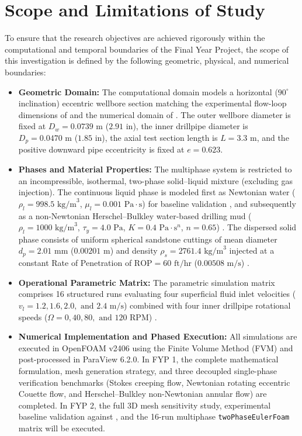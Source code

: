 \section{Scope and Limitations of Study}
To ensure that the research objectives are achieved rigorously within the computational and temporal boundaries of the Final Year Project, the scope of this investigation is defined by the following geometric, physical, and numerical boundaries:
\begin{itemize}
    \item \textbf{Geometric Domain:} The computational domain models a horizontal ($90^\circ$ inclination) eccentric wellbore section matching the experimental flow-loop dimensions of \citet{Osgouei2010} and the numerical domain of \citet{Shehab2015}. The outer wellbore diameter is fixed at $D_w = 0.0739\text{ m}$ ($2.91\text{ in}$), the inner drillpipe diameter is $D_p = 0.0470\text{ m}$ ($1.85\text{ in}$), the axial test section length is $L = 3.3\text{ m}$, and the positive downward pipe eccentricity is fixed at $e = 0.623$.
    \item \textbf{Phases and Material Properties:} The multiphase system is restricted to an incompressible, isothermal, two-phase solid--liquid mixture (excluding gas injection). The continuous liquid phase is modeled first as Newtonian water ($\rho_l = 998.5\text{ kg/m}^3$, $\mu_l = 0.001\text{ Pa}\cdot\text{s}$) for baseline validation \citep{Shehab2015}, and subsequently as a non-Newtonian Herschel--Bulkley water-based drilling mud ($\rho_l = 1000\text{ kg/m}^3$, $\tau_y = 4.0\text{ Pa}$, $K = 0.4\text{ Pa}\cdot\text{s}^n$, $n = 0.65$) \citep{Hajipour2020, Sorgun2010}. The dispersed solid phase consists of uniform spherical sandstone cuttings of mean diameter $d_p = 2.01\text{ mm}$ ($0.00201\text{ m}$) and density $\rho_s = 2761.4\text{ kg/m}^3$ injected at a constant Rate of Penetration of $\text{ROP} = 60\text{ ft/hr}$ ($0.00508\text{ m/s}$) \citep{Osgouei2010, Shehab2015}.
    \item \textbf{Operational Parametric Matrix:} The parametric simulation matrix comprises 16 structured runs evaluating four superficial fluid inlet velocities ($v_l = 1.2, 1.6, 2.0,\text{ and } 2.4\text{ m/s}$) combined with four inner drillpipe rotational speeds ($\Omega = 0, 40, 80,\text{ and } 120\text{ RPM}$) \citep{Osgouei2010, Shehab2015}.
    \item \textbf{Numerical Implementation and Phased Execution:} All simulations are executed in OpenFOAM v2406 using the Finite Volume Method (FVM) and post-processed in ParaView 6.2.0. In FYP 1, the complete mathematical formulation, mesh generation strategy, and three decoupled single-phase verification benchmarks (Stokes creeping flow, Newtonian rotating eccentric Couette flow, and Herschel--Bulkley non-Newtonian annular flow) are completed. In FYP 2, the full 3D mesh sensitivity study, experimental baseline validation against \citet{Osgouei2010}, and the 16-run multiphase \texttt{twoPhaseEulerFoam} matrix will be executed.
\end{itemize}

